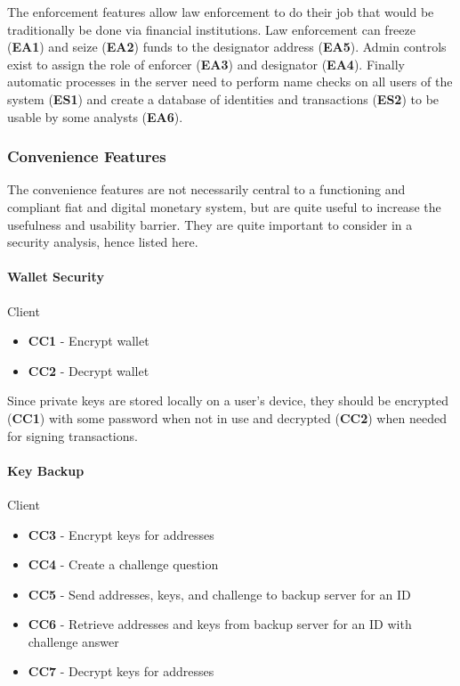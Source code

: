 \documentclass[12pt]{article} %
\begin{document}
{{The enforcement features allow law enforcement to do their job that would be traditionally be done via financial institutions. Law enforcement can freeze (\textbf{EA1}) and seize (\textbf{EA2}) funds to the designator address (\textbf{EA5}). Admin controls exist to assign the role of enforcer (\textbf{EA3}) and designator (\textbf{EA4}). Finally automatic processes in the server need to perform name checks on all users of the system (\textbf{ES1}) and create a database of identities and transactions (\textbf{ES2}) to be usable by some analysts (\textbf{EA6}).

\subsubsection{Convenience Features} \label{sssec:3.3:backup}

The convenience features are not necessarily central to a functioning and compliant fiat and digital monetary system, but are quite useful to increase the usefulness and usability barrier. They are quite important to consider in a security analysis, hence listed here.

\paragraph{Wallet Security}
Client
\begin{itemize}
	\item \textbf{CC1} - Encrypt wallet
	\item \textbf{CC2} - Decrypt wallet
\end{itemize}

Since private keys are stored locally on a user's device, they should be encrypted (\textbf{CC1}) with some password when not in use and decrypted (\textbf{CC2}) when needed for signing transactions.

\paragraph{Key Backup}

Client
\begin{itemize}
	\item \textbf{CC3} - Encrypt keys for addresses
	\item \textbf{CC4} - Create a challenge question
	\item \textbf{CC5} - Send addresses, keys, and challenge to backup server for an ID
	\item \textbf{CC6} - Retrieve addresses and keys from backup server for an ID with challenge answer
	\item \textbf{CC7} - Decrypt keys for addresses
\end{itemize}

}}
\end{document}
